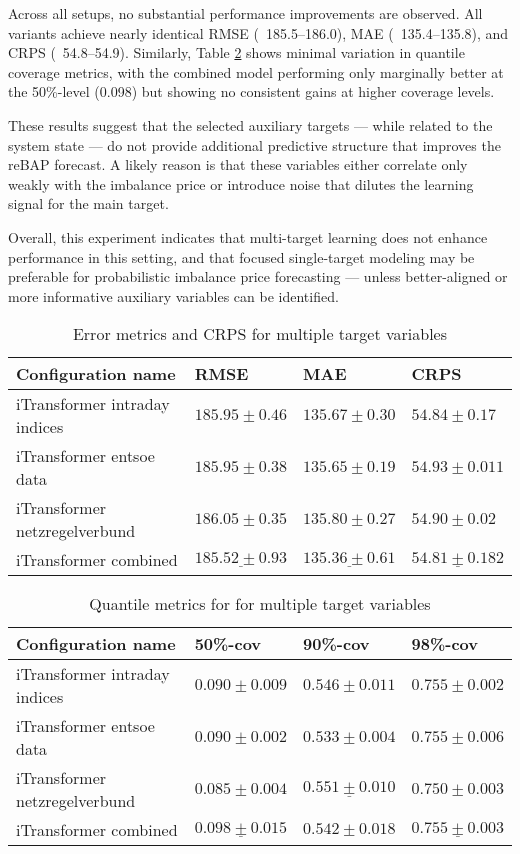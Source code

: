 \documentclass[class=scrbook, crop=false]{standalone}
\begin{document}
Across all setups, no substantial performance improvements are observed. All variants achieve nearly identical RMSE (~185.5–186.0), MAE (~135.4–135.8), and CRPS (~54.8–54.9). Similarly, Table \ref{Table::Performance_targets2} shows minimal variation in quantile coverage metrics, with the combined model performing only marginally better at the 50\%-level (0.098) but showing no consistent gains at higher coverage levels.

These results suggest that the selected auxiliary targets — while related to the system state — do not provide additional predictive structure that improves the reBAP forecast. A likely reason is that these variables either correlate only weakly with the imbalance price or introduce noise that dilutes the learning signal for the main target.

Overall, this experiment indicates that multi-target learning does not enhance performance in this setting, and that focused single-target modeling may be preferable for probabilistic imbalance price forecasting — unless better-aligned or more informative auxiliary variables can be identified.

 \begin{table}[]
\centering
\begin{tabular}{l|l|l|l}
 Configuration name			&  RMSE 			& MAE 			& CRPS 			 \\\hline
 iTransformer intraday indices 		&$ 185.95\pm 0.46	$&$ 135.67 \pm 0.30	$&$ 54.84\pm0.17	$\\
 iTransformer entsoe data		&$  185.95 \pm 0.38 $&$ 135.65 \pm 0.19		$&$ 54.93 \pm 0.011		 $\\
 iTransformer netzregelverbund 	& $186.05 \pm 0.35	$&$ 135.80\pm0.27	$&$ 54.90\pm 0.02	$\\
 iTransformer combined 		&$ \underline{185.52 \pm 0.93}	$&$ \underline{135.36\pm 0.61}	$&$ \underline{54.81\pm 0.18	2} $\\
\end{tabular}
\caption{Error metrics and CRPS for multiple target variables}
\label{Table::Performance_targets}
\end{table}
\begin{table}
\centering
\begin{tabular}{l|l|l|l}
 Configuration name			& 50\%-cov 		& 90\%-cov 		& 98\%-cov \\\hline
 iTransformer intraday indices 		&$0.090\pm 0.009	$& $0.546\pm 0.011	$ & $0.755 \pm 0.002$\\
 iTransformer entsoe data		&$0.090 \pm  0.002	$&$ 0.533 \pm 0.004	$&$0.755 \pm 0.006 $\\
 iTransformer netzregelverbund 	&$0.085\pm 0.004	$&$\underline{0.551 \pm 0.010}	$&$ 0.750 \pm 0.003$\\
 iTransformer combined 		&$ \underline{0.098\pm 0.015}	$&$ 0.542 \pm 0.018 	$&$ \underline{0.755 \pm 0.003}$\\
\end{tabular}
\caption{Quantile metrics for for  multiple target variables}
\label{Table::Performance_targets2}
\end{table}
\end{document}

